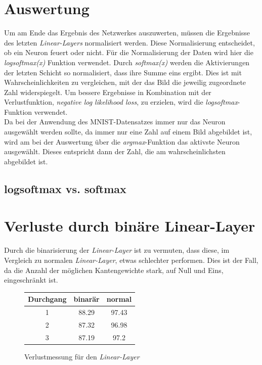 \section{Auswertung}
Um am Ende das Ergebnis des Netzwerkes auszuwerten, müssen die Ergebnisse des letzten \textit{Linear-Layers} normalisiert werden. Diese Normalisierung entscheidet, ob ein Neuron feuert oder nicht. Für die Normalisierung der Daten wird hier die \textit{logsoftmax(x)} Funktion verwendet. Durch \textit{softmax(x)} werden die Aktivierungen der letzten Schicht so normalisiert, dass ihre Summe eins ergibt. Dies ist mit Wahrscheinlichkeiten zu vergleichen, mit der das Bild die jeweilig zugeordnete Zahl widerspiegelt. Um bessere Ergebnisse in Kombination mit der Verlustfunktion, \textit{negative log likelihood loss}, zu erzielen, wird die \textit{logsoftmax}-Funktion verwendet.\\
Da bei der Anwendung des MNIST-Datensatzes immer nur das Neuron ausgewählt werden sollte, da immer nur eine Zahl auf einem Bild abgebildet ist, wird am bei der Auswertung über die \textit{argmax}-Funktion das aktivste Neuron ausgewählt. Dieses entspricht dann der Zahl, die am wahrscheinlichsten abgebildet ist.

\subsection{logsoftmax vs. softmax}
\section{Verluste durch binäre Linear-Layer}
Durch die binarisierung der \textit{Linear-Layer} ist zu vermuten, dass diese, im Vergleich zu normalen \textit{Linear-Layer}, etwas schlechter performen. Dies ist der Fall, da die Anzahl der möglichen Kantengewichte stark, auf Null und Eins, eingeschränkt ist. 
\begin{figure}[h]
	\centering
	\begin{tabular}{|c|c|c|}\hline
		Durchgang&binarär&normal\\\hline
		1&88.29&97.43\\\hline
		2&87.32&96.98\\\hline
		3&87.19&97.2\\\hline
	\end{tabular}
\caption{Verlustmessung für den \textit{Linear-Layer}}
\label{fig:linar-layer-verluste}
\end{figure}


